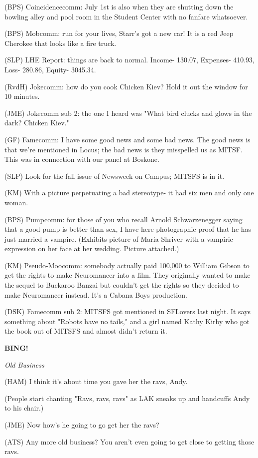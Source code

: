 \documentclass[12pt]{article}
\newcommand{\bing}{{\bf BING!} }
\newcommand{\goto}[1]{\bing \vskip 12pt \centerline{{\em{#1}}}}
\begin{document}
(BPS) Coincidencecomm: July 1st is also when they are shutting down the bowling alley and pool room in the Student Center with no fanfare whatsoever.

(BPS) Mobcomm: run for your lives, Starr's got a new car! It is a red Jeep Cherokee that looks like a fire truck.

(SLP) LHE Report: things are back to normal. Income- 130.07, Expenses- 410.93, Loss- 280.86, Equity- 3045.34.

(RvdH) Jokecomm: how do you cook Chicken Kiev? Hold it out the window for 10 minutes.

(JME) Jokecomm sub 2: the one I heard was "What bird clucks and glows in the dark? Chicken Kiev."

(GF) Famecomm: I have some good news and some bad news. The good news is that we're mentioned in Locus; the bad news is they misspelled us as MITSF. This was in connection with our panel at Boskone.

(SLP) Look for the fall issue of Newsweek on Campus; MITSFS is in it.

(KM) With a picture perpetuating a bad stereotype- it had six men and only one woman.

(BPS) Pumpcomm: for those of you who recall Arnold Schwarzenegger saying that a good pump is better than sex, I have here photographic proof that he has just married a vampire. (Exhibits picture of Maria Shriver with a vampiric expression on her face at her wedding. Picture attached.)

(KM) Pseudo-Moocomm: somebody actually paid 100,000 to William Gibson to get the rights to make Neuromancer into a film. They originally wanted to make the sequel to Buckaroo Banzai but couldn't get the rights so they decided to make Neuromancer instead. It's a Cabana Boys production.

(DSK) Famecomm sub 2: MITSFS got mentioned in SFLovers last night. It says something about "Robots have no tails," and a girl named Kathy Kirby who got the book out of MITSFS and almost didn't return it.

\goto{Old Business}

(HAM) I think it's about time you gave her the ravs, Andy.

(People start chanting "Ravs, ravs, ravs" as LAK sneaks up and handcuffs Andy to his chair.)

(JME) Now how's he going to go get her the ravs?

(ATS) Any more old business? You aren't even going to get close to getting those ravs.
\end{document}

